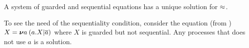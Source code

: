


\begin{theorem}
\label{t:Mil89}
A system of guarded and sequential equations
   has 
a unique solution
 for $\approx$.
\end{theorem} 

To see the  need of the
 sequentiality  condition, 
  consider
 the equation (from \cite{Mil89}) $X = {\boldsymbol \nu} a\: (a. X | \overline{a})$
where $X$ is guarded but not sequential. Any processes that does
not use  $a$
 is a solution.
